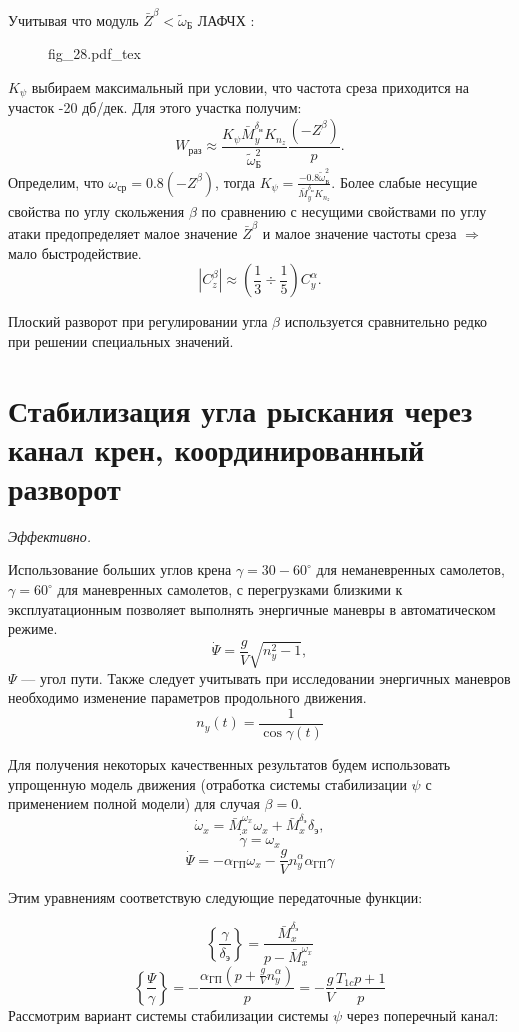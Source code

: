 \documentclass{article}
\begin{document}
Учитывая что модуль $\bar{Z}^\beta < \tilde{\omega}_\text{Б}$
ЛАФЧХ :
\begin{figure}[H]
	\centering
	{fig_28.pdf_tex}
\end{figure}

$K_{\psi}$ выбираем максимальный при условии, что частота среза приходится на
участок -20 дб/дек. Для этого участка получим:
\[
	W_\text{раз} \approx \frac{K_{\psi}\bar{M}_y^{\delta_\text{н}}
	K_{n_z}}{\tilde{\omega}_\text{Б}^2}\frac{(-Z^\beta)}{p}.
\]
Определим, что $\omega_\text{ср} = 0.8(-Z^\beta)$, тогда $K_{\psi}=\frac{-0.8
	\tilde{\omega}_\text{Б}^2}{\bar{M}_y^{\delta_\text{н}} K_{n_z}}$.
Более слабые несущие свойства по углу скольжения $\beta$ по сравнению с
несущими свойствами по углу атаки предопределяет малое значение $\bar{Z}^\beta$
и малое значение частоты среза $\Rightarrow$ мало быстродействие.
\[
	|C_z^\beta| \approx (\frac{1}{3} \div\frac{1}{5}) C_y^\alpha.
\]

Плоский разворот при регулировании угла $\beta$ используется сравнительно редко
при решении специальных значений.

\section{Стабилизация угла рыскания через канал крен, координированный
	разворот}

\hfill \textit{Эффективно.}

Использование больших углов крена $\gamma = 30 - 60^\circ$ для неманевренных
самолетов, $\gamma = 60^\circ$ для маневренных самолетов, с перегрузками
близкими к эксплуатационным позволяет выполнять энергичные маневры в
автоматическом режиме.
\[
	\dot{\Psi} =\frac{g}{V} \sqrt{n_y^2 -1},
\]
$\Psi$ --- угол пути. Также следует учитывать при исследовании энергичных
маневров необходимо изменение параметров продольного движения.
\[
	n_y(t) =\frac{1}{\cos{\gamma(t)}}
\]

Для получения некоторых качественных результатов будем использовать упрощенную
модель движения (отработка системы стабилизации $\psi$ с применением полной
модели) для случая $\beta = 0$.
\[
    \dot{\omega}_x =\bar{M}_x^{\omega_x} \omega_x
	+\bar{M}_{x}^{\delta_\text{э}} \delta_\text{э},
\]
\[
	\dot{\gamma} = \omega_x
\]
\[
	\dot{\Psi} = - \alpha_\text{ГП}\omega_x - \frac{g}{V} n_y^\alpha
	\alpha_\text{ГП}\gamma
\]

Этим уравнениям соответствую следующие передаточные функции:

\[
	\left\{\frac{\gamma}{\delta_\text{э}} \right\} =\frac{\bar{M}_{x}^{\delta_\text{э}}}{p
	-\bar{M}_x^{\omega_x}}
\]
\[
    \left\{\frac{\Psi}{\gamma} \right\} = - \frac{\alpha_\text{ГП} (p +
		\frac{g}{V}n_y^\alpha)}{p} = -\frac{g}{V} \frac{T_{1c}p + 1}{p}
\]
Рассмотрим вариант системы стабилизации системы $\psi$ через поперечный канал:
\end{document}
